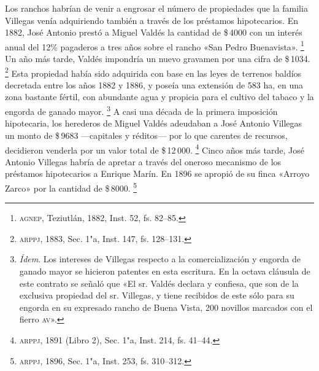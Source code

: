 \documentclass[14pt,twoside,final]{extbook} %
\let\oldfootnote\footnote
\renewcommand\footnote[1]{%
\oldfootnote{\hspace{1mm}#1}}
\begin{document}
Los ranchos habrían de venir a engrosar el número de propiedades que la familia Villegas venía adquiriendo también a través de los préstamos hipotecarios. En 1882, José Antonio prestó a Miguel Valdés la cantidad de \$\,4000 con un interés anual del 12\% pagaderos a tres años sobre el rancho «San Pedro Buenavista».\footnote{\textsc{agnep}, Teziutlán, 1882, Inst. 52, fs. 82--85.} Un año más tarde, Valdés impondría un nuevo gravamen por una cifra de \$\,1034.\footnote{\textsc{arppj}, 1883, Sec. 1"a, Inst. 147, fs. 128--131.} Esta propiedad había sido adquirida con base en las leyes de terrenos baldíos decretada entre los años 1882 y 1886, y poseía una extensión de 583 ha, en una zona bastante fértil, con abundante agua y propicia para el cultivo del tabaco y la engorda de ganado mayor.\footnote{\emph{Ídem}. Los intereses de Villegas respecto a la comercialización y engorda de ganado mayor se hicieron patentes en esta escritura. En la octava cláusula de este contrato se señaló que «El sr. Valdés declara y confiesa, que son de la exclusiva propiedad del sr. Villegas, y tiene recibidos de este sólo para su engorda en su expresado rancho de Buena Vista, 200 novillos marcados con el fierro \textsc{av}».} A casi una década de la primera imposición hipotecaria, los herederos de Miguel Valdés adeudaban a José Antonio Villegas un monto de \$\,9683 ---capitales y réditos--- por lo que carentes de recursos, decidieron venderla por un valor total de \$\,12\,000.\footnote{\textsc{arppj}, 1891 (Libro 2), Sec. 1"a, Inst. 214, fs. 41--44.} Cinco años más tarde, José Antonio Villegas habría de apretar a través del oneroso mecanismo de los préstamos hipotecarios a Enrique Marín. En 1896 se apropió de su finca «Arroyo Zarco» por la cantidad de \$\,8000.\footnote{\textsc{arppj}, 1896, Sec. 1"a, Inst. 253, fs. 310--312.}
\end{document}

